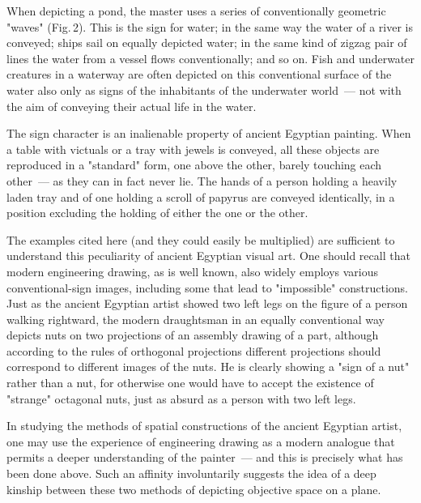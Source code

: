 When depicting a pond, the master uses a series of conventionally geometric "waves"
(Fig.\,2). This is the sign for water; in the same way the water of a river is conveyed;
ships sail on equally depicted water; in the same kind of zigzag pair of lines the water
from a vessel flows conventionally; and so on. Fish and underwater creatures in a
waterway are often depicted on this conventional surface of the water also only as signs
of the inhabitants of the underwater world~--- not with the aim of conveying their actual
life in the water.

The sign character is an inalienable property of ancient Egyptian painting. When a table
with victuals or a tray with jewels is conveyed, all these objects are reproduced in a
"standard" form, one above the other, barely touching each other~--- as they can in fact
never lie. The hands of a person holding a heavily laden tray and of one holding a scroll
of papyrus are conveyed identically, in a position excluding the holding of either the
one or the other.

The examples cited here (and they could easily be multiplied) are sufficient to
understand this peculiarity of ancient Egyptian visual art. One should recall that modern
engineering drawing, as is well known, also widely employs various conventional-sign
images, including some that lead to "impossible" constructions. Just as the ancient
Egyptian artist showed two left legs on the figure of a person walking rightward, the
modern draughtsman in an equally conventional way depicts nuts on two projections
of an assembly drawing of a part, although according to the rules of orthogonal
projections different projections should correspond to different images of the nuts.
He is clearly showing a "sign of a nut" rather than a nut, for otherwise one would have
to accept the existence of "strange" octagonal nuts, just as absurd as a person with two
left legs.



In studying the methods of spatial constructions of the ancient Egyptian artist, one may
use the experience of engineering drawing as a modern analogue that permits a deeper
understanding of the painter~--- and this is precisely what has been done above. Such
an affinity involuntarily suggests the idea of a deep kinship between these two methods
of depicting objective space on a plane.

